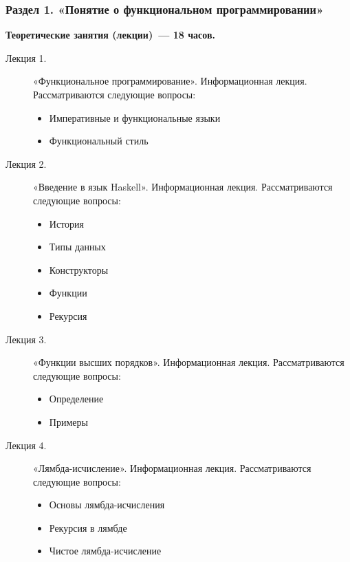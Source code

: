 \subsubsection{Раздел 1. «Понятие о функциональном программировании»}

{\parindent0pt

\textbf{Теоретические занятия (лекции)~— 18 часов.}
\begin{description}
\item[Лекция 1.] «Функциональное программирование». Информационная лекция. Рассматриваются следующие вопросы: \begin{itemize}
\item Императивные и функциональные языки\item Функциональный стиль
\end{itemize}\item[Лекция 2.] «Введение в язык Haskell». Информационная лекция. Рассматриваются следующие вопросы: \begin{itemize}
\item История\item Типы данных\item Конструкторы\item Функции\item Рекурсия
\end{itemize}\item[Лекция 3.] «Функции высших порядков». Информационная лекция. Рассматриваются следующие вопросы: \begin{itemize}
\item Определение\item Примеры
\end{itemize}\item[Лекция 4.] «Лямбда-исчисление». Информационная лекция. Рассматриваются следующие вопросы: \begin{itemize}
\item Основы лямбда-исчисления\item Рекурсия в лямбде\item Чистое лямбда-исчисление
\end{itemize}
\end{description}




}
